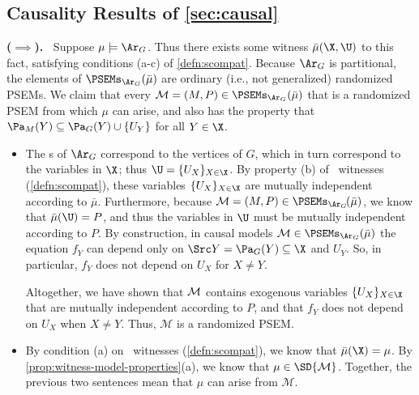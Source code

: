 \begin{subappendices}
\newpage
\subsection{Causality Results of \cref{sec:causal}}
\begin{lproof}\label{proof:sc-graph-arise}
    \textbf{($\implies$).~} Suppose $\mu \models \Ar_G$. 
    Thus there exists some witness $\bar\mu(\X,\U)$ to this fact, satisfying conditions (a-c) of \cref{defn:scompat}. 
    Because $\Ar_G$ is partitional, the elements
    of $\PSEMs_{\Ar_G}(\bar\mu)$ are ordinary (i.e., not generalized) randomized PSEMs.
    We claim that every $\mathcal M = (M,P) \in \PSEMs_{\Ar_G}(\bar\mu)$ that is a randomized PSEM from which $\mu$ can arise,
    and also has the property that $\Pa_M(Y) \subseteq \Pa_G(Y) \cup \{U_Y\}$ for all $Y \in \X$. 
    \begin{itemize}[left=1em]
    \item 
    The \hyperarc s of $\Ar_G$ correspond to the vertices of $G$, which in turn correspond to the variables in $\X$; thus $\U = \{ U_X \}_{X \in \X}$. 
    By property (b) of \scibility\ witnesses (\cref{defn:scompat}), these variables $\{ U_X \}_{X \in \X}$ are mutually independent according to $\bar\mu$. 
    Furthermore, because $\mathcal M = (M, P) \in \PSEMs_{\Ar_{G}\!}(\bar\mu)$, we know that $\bar\mu(\U) = P$, 
    and thus the variables in $\U$ must be mutually independent according to $P$.
    By construction, in causal models $\mathcal M \in \PSEMs_{\Ar_G}(\bar\mu)$ the equation $f_Y$ can depend only on $\Src Y = \Pa_G(Y) \subseteq \X$ and $U_Y$. So, in particular, $f_Y$ does not depend on $U_X$ for $X \ne Y$.
    
    Altogether, we have shown that ${\cal M}$ contains exogenous variables $\{ U_X \}_{X \in \X}$ that are mutually independent according to $P$, and that $f_Y$ does not depend on $U_X$ when $X \ne Y$. 
    Thus, $\mathcal M$ is a randomized PSEM.

    \item 
    By condition (a) on \scibility\ witnesses (\cref{defn:scompat}), we know that $\bar\mu(\X) = \mu$. By \cref{prop:witness-model-properties}(a), we know that $\mu \in \SD{\cal M}$. 
    Together, the previous two sentences mean that $\mu$ can arise from $\mathcal M$.
    

\end{itemize}
\end{lproof}
\end{subappendices}
